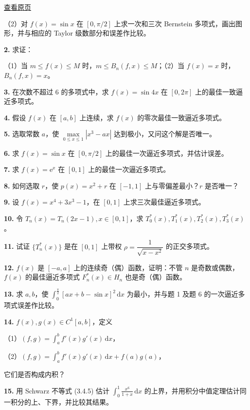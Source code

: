 \documentclass[
  10pt,
  fontset=fandol]{ctexart}
\begin{document}
\href{../../source-images/pdf-091.jpeg}{查看原页}

（2）对 \(f(x)=\sin x\) 在 \([0,\pi/2]\) 上求一次和三次 Bernstein 多项式，画出图形，并与相应的 Taylor 级数部分和误差作比较。

\textbf{2.} 求证：

（1）当 \(m\leqslant f(x)\leqslant M\) 时，\(m\leqslant B_n(f,x)\leqslant M\)；（2）当 \(f(x)=x\) 时，\(B_n(f,x)=x\)。

\textbf{3.} 在次数不超过 \(6\) 的多项式中，求 \(f(x)=\sin4x\) 在 \([0,2\pi]\) 上的最佳一致逼近多项式。

\textbf{4.} 假设 \(f(x)\) 在 \([a,b]\) 上连续，求 \(f(x)\) 的零次最佳一致逼近多项式。

\textbf{5.} 选取常数 \(a\)，使 \(\max\limits_{0\leqslant x\leqslant1}|x^3-ax|\) 达到极小，又问这个解是否唯一。

\textbf{6.} 求 \(f(x)=\sin x\) 在 \([0,\pi/2]\) 上的最佳一次逼近多项式，并估计误差。

\textbf{7.} 求 \(f(x)=\mathrm e^x\) 在 \([0,1]\) 上的最佳一次逼近多项式。

\textbf{8.} 如何选取 \(r\)，使 \(p(x)=x^2+r\) 在 \([-1,1]\) 上与零偏差最小？\(r\) 是否唯一？

\textbf{9.} 设 \(f(x)=x^4+3x^3-1\)，在 \([0,1]\) 上求三次最佳逼近多项式。

\textbf{10.} 令 \(T_n(x)=T_n(2x-1),x\in[0,1]\)，求 \(T_0^*(x),T_1^*(x),T_2^*(x),T_3^*(x)\)。

\textbf{11.} 试证 \(\{T_n^*(x)\}\) 是在 \([0,1]\) 上带权 \(\rho=\dfrac1{\sqrt{x-x^2}}\) 的正交多项式。

\textbf{12.} \(f(x)\) 是 \([-a,a]\) 上的连续奇（偶）函数，证明：不管 \(n\) 是奇数或偶数，\(f(x)\) 的最佳逼近多项式 \(F_n^*(x)\in H_n\) 也是奇（偶）函数。

\textbf{13.} 求 \(a,b\)，使 \(\displaystyle\int_0^{\frac\pi2}[ax+b-\sin x]^2\,\mathrm dx\) 为最小，并与题 1 及题 6 的一次逼近多项式误差作比较。

\textbf{14.} \(f(x),g(x)\in C^1[a,b]\)，定义

（1）\((f,g)=\displaystyle\int_a^b f'(x)g'(x)\,\mathrm dx\)，

（2）\((f,g)=\displaystyle\int_a^b f'(x)g'(x)\,\mathrm dx+f(a)g(a)\)，

它们是否构成内积？

\textbf{15.} 用 Schwarz 不等式 (3.4.5) 估计 \(\displaystyle\int_0^1\frac{x^6}{1+x}\,\mathrm dx\) 的上界，并用积分中值定理估计同一积分的上、下界，并比较其结果。
\end{document}
